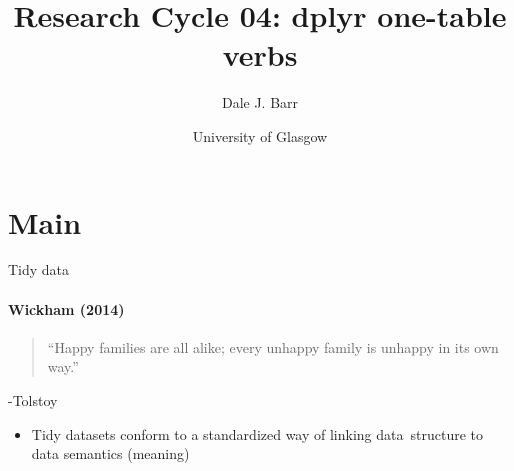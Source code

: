 \documentclass[presentation]{beamer}
\author{Dale J. Barr}
\date{University of Glasgow}
\title{Research Cycle 04: dplyr one-table verbs}
\begin{document}
\maketitle

\section*{Main}
\label{sec:orgb59e705}

\begin{frame}[label={sec:org9f5ac3d}]{Tidy data}
\framesubtitle{Wickham (2014)}
\begin{Large}

\begin{quote}
``Happy families are all alike; every unhappy family is unhappy in its own way.''
\end{quote}

\end{Large}
\begin{flushright}-Tolstoy\end{flushright}

\begin{itemize}
\item Tidy datasets conform to a standardized way of linking
\alert{data~structure} to \alert{data semantics} (meaning)
\end{itemize}
\end{frame}
\end{document}
